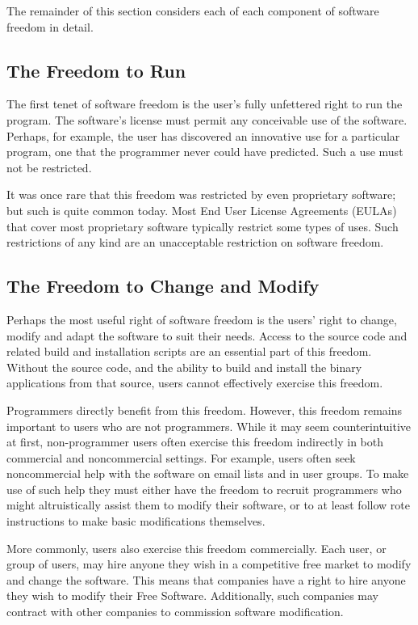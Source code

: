 The remainder of this section considers each of each component of software
freedom in detail.

\subsection{The Freedom to Run}

The first tenet of software freedom is the user's fully unfettered right to
run the program.  The software's license must permit any conceivable use of
the software.  Perhaps, for example, the user has discovered an innovative
use for a particular program, one that the programmer never could have
predicted.  Such a use must not be restricted.

It was once rare that this freedom was restricted by even proprietary
software; but such is quite common today. Most End User License Agreements
(EULAs) that cover most proprietary software typically restrict some types of
uses.  Such restrictions of any kind are an unacceptable restriction on
software freedom.

\subsection{The Freedom to Change and Modify}

Perhaps the most useful right of software freedom is the users' right to
change, modify and adapt the software to suit their needs.  Access to the
source code and related build and installation scripts are an essential part
of this freedom.  Without the source code, and the ability to build and
install the binary applications from that source, users cannot effectively
exercise this freedom.

Programmers directly benefit from this freedom.  However, this freedom
remains important to users who are not programmers.  While it may seem
counterintuitive at first, non-programmer users often exercise this freedom
indirectly in both commercial and noncommercial settings.  For example, users
often seek noncommercial help with the software on email lists and in user
groups.  To make use of such help they must either have the freedom to
recruit programmers who might altruistically assist them to modify their
software, or to at least follow rote instructions to make basic modifications
themselves.

More commonly, users also exercise this freedom commercially.  Each user, or
group of users, may hire anyone they wish in a competitive free market to
modify and change the software.  This means that companies have a right to
hire anyone they wish to modify their Free Software.  Additionally, such
companies may contract with other companies to commission software
modification.

